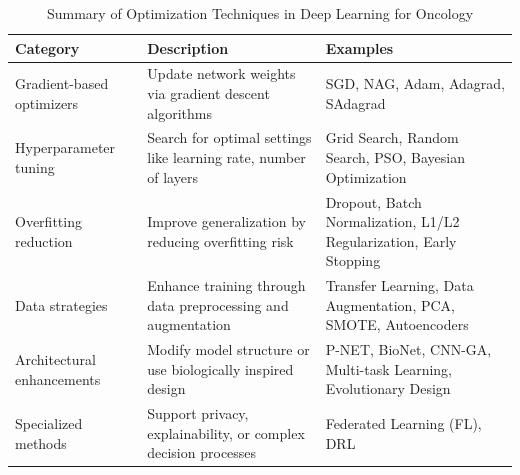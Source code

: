 \renewcommand{\arraystretch}{1.35}
\begin{table}[t]
\centering
\caption{Summary of Optimization Techniques in Deep Learning for Oncology}
\label{tab:optimization-techniques}
\begin{tabular}{|p{4cm}|p{4cm}|p{4cm}|}
\hline
\textbf{Category} & \textbf{Description} & \textbf{Examples} \\
\hline
Gradient-based optimizers & Update network weights via gradient descent algorithms & SGD, NAG, Adam, Adagrad, SAdagrad \\
\hline
Hyperparameter tuning & Search for optimal settings like learning rate, number of layers & Grid Search, Random Search, PSO, Bayesian Optimization \\
\hline
Overfitting reduction & Improve generalization by reducing overfitting risk & Dropout, Batch Normalization, L1/L2 Regularization, Early Stopping \\
\hline
Data strategies & Enhance training through data preprocessing and augmentation & Transfer Learning, Data Augmentation, PCA, SMOTE, Autoencoders \\
\hline
Architectural enhancements & Modify model structure or use biologically inspired design & P-NET, BioNet, CNN-GA, Multi-task Learning, Evolutionary Design \\
\hline
Specialized methods & Support privacy, explainability, or complex decision processes & Federated Learning (FL), DRL \\
\hline
\end{tabular}
\end{table}



